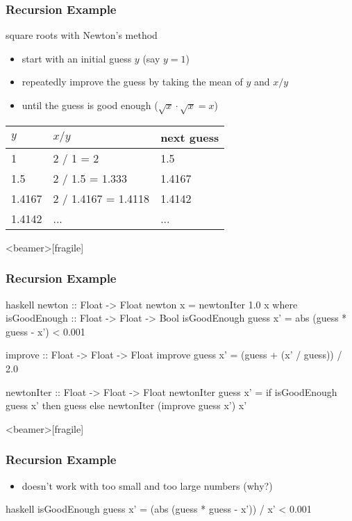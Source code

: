 \documentclass[dvipsnames]{beamer}
\theoremstyle{plain}
\begin{document}
\begin{frame}
  \frametitle{Recursion Example}

  \begin{exampleblock}{square roots with Newton's method}
    \begin{itemize}
      \item start with an initial guess $y$ (say $y = 1$)
      \item repeatedly improve the guess by taking the mean of $y$
        and $x / y$
      \item until the guess is good enough ($\sqrt x \cdot \sqrt x = x$)
    \end{itemize}

    \begin{center}
      \begin{tabular}{lll}
      $y$      & $x / y$             & next guess\\\hline
      1        & 2 / 1 = 2           & 1.5\\
      1.5      & 2 / 1.5 = 1.333     & 1.4167\\
      1.4167   & 2 / 1.4167 = 1.4118 & 1.4142\\
      1.4142   & ...                 & ...
      \end{tabular}
    \end{center}
  \end{exampleblock}
\end{frame}

\begin{frame}<beamer>[fragile]
  \frametitle{Recursion Example}

  \begin{exampleblock}{}
    \begin{pygments}{haskell}
newton :: Float -> Float
newton x = newtonIter 1.0 x
  where
    isGoodEnough :: Float -> Float -> Bool
    isGoodEnough guess x' =
        abs (guess * guess - x') < 0.001

    improve :: Float -> Float -> Float
    improve guess x' = (guess + (x' / guess)) / 2.0

    newtonIter :: Float -> Float -> Float
    newtonIter guess x' =
        if isGoodEnough guess x'
            then guess
            else newtonIter (improve guess x') x'
    \end{pygments}
  \end{exampleblock}
\end{frame}

\begin{frame}<beamer>[fragile]
  \frametitle{Recursion Example}

  \begin{exampleblock}{}
    \begin{itemize}
      \item doesn't work with too small and too large numbers (why?)
    \end{itemize}

    \pause
    \smallskip
    \begin{pygments}{haskell}
isGoodEnough guess x' =
    (abs (guess * guess - x')) / x' < 0.001
    \end{pygments}
  \end{exampleblock}
\end{frame}
\end{document}
